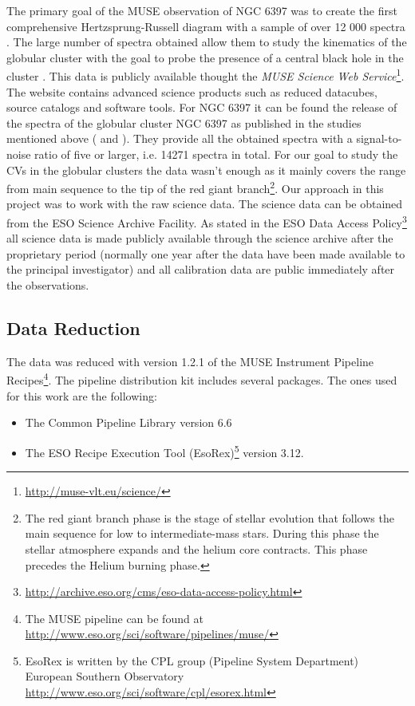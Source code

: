 The primary goal of the MUSE observation of NGC 6397 was to create the first comprehensive Hertzsprung-Russell diagram with a sample of over 12 000 spectra \citep{husser_muse_2016}. The large number of spectra obtained allow them to study the kinematics of the globular cluster with the goal to probe the presence of a central black hole in the cluster \citep{kamann_muse_2016}. This data is publicly available thought the \emph{MUSE Science Web Service}\footnote{\url{http://muse-vlt.eu/science/}}. The website contains advanced science products such as reduced datacubes, source catalogs and software tools. For NGC 6397 it can be found the release of the spectra of the globular cluster NGC 6397 as published in the studies mentioned above (\cite{husser_muse_2016} and \cite{kamann_muse_2016}). They provide all the obtained spectra with a signal-to-noise ratio of five or larger, i.e. 14271 spectra in total. For our goal to study the CVs in the globular clusters the data wasn't enough as it mainly covers the range from main sequence to the tip of the red giant branch\footnote{The red giant branch phase is the stage of stellar evolution that follows the main sequence for low to intermediate-mass stars. During this phase the stellar atmosphere expands and the helium core contracts. This phase precedes the Helium burning phase. }. Our approach in this project was to work with the raw science data. The science data can be obtained from the ESO  Science Archive Facility. As stated in the ESO Data Access Policy\footnote{\url{http://archive.eso.org/cms/eso-data-access-policy.html}} all science data is made publicly available through the science archive after the proprietary period (normally one year after the data have been made available to the principal investigator) and all calibration data are public immediately after the observations.  

\subsection{Data Reduction}

The data was reduced with version 1.2.1 of the MUSE Instrument Pipeline Recipes\footnote{The MUSE pipeline can be found at \url{http://www.eso.org/sci/software/pipelines/muse/}}\citep{weilbacher_design_2012}. The pipeline distribution kit includes several packages. The ones used for this work are the following:

\begin{itemize}
        \item The Common Pipeline Library version 6.6 \citep{mckay_common_2004}
        \item The ESO Recipe Execution Tool (EsoRex)\footnote{EsoRex is written by the CPL group (Pipeline System Department) European Southern Observatory \url{http://www.eso.org/sci/software/cpl/esorex.html}} version 3.12.
\end{itemize}

